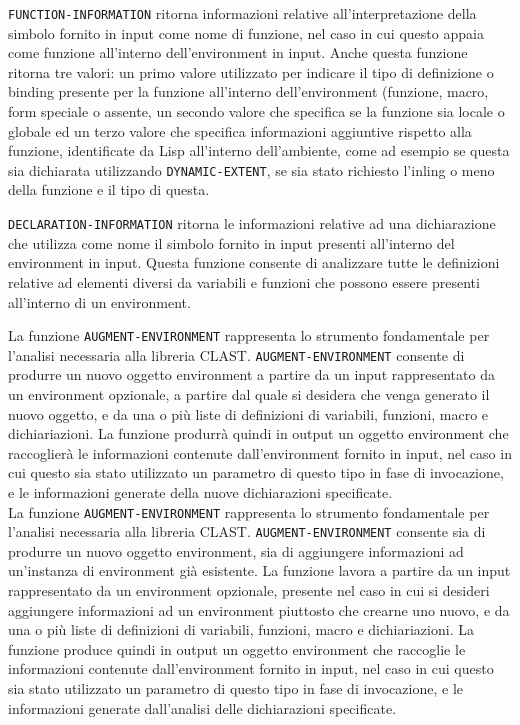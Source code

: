 \texttt{FUNCTION-INFORMATION} ritorna informazioni relative all’interpretazione
della simbolo fornito in input come nome di funzione, nel caso in cui questo
appaia come funzione all’interno dell’environment in input. Anche questa
funzione ritorna tre valori: un primo valore utilizzato per indicare il tipo di
definizione o binding presente per la funzione all’interno dell’environment
(funzione, macro, form speciale o assente, un secondo valore che specifica se
la funzione sia locale o globale ed un terzo valore che specifica informazioni
aggiuntive rispetto alla funzione, identificate da Lisp all’interno
dell’ambiente, come ad esempio se questa sia dichiarata utilizzando \texttt
{DYNAMIC-EXTENT}, se sia stato richiesto l’inling o meno della funzione e il
tipo di questa.

\texttt{DECLARATION-INFORMATION} ritorna le informazioni relative ad una
dichiarazione che utilizza come nome il simbolo fornito in input presenti
all’interno del environment in input. Questa funzione consente di analizzare
tutte le definizioni relative ad elementi diversi da variabili e funzioni che
possono essere presenti all’interno di un environment.

La funzione \texttt{AUGMENT-ENVIRONMENT} rappresenta lo strumento fondamentale
per l’analisi necessaria alla libreria CLAST. \texttt{AUGMENT-ENVIRONMENT}
consente di produrre un nuovo oggetto environment a partire da un input
rappresentato da un environment opzionale, a partire dal quale si desidera che
venga generato il nuovo oggetto, e da una o più liste di definizioni di
variabili, funzioni, macro e dichiariazioni. La funzione produrrà quindi in
output un oggetto environment che raccoglierà le informazioni contenute
dall'environment fornito in input, nel caso in cui questo sia stato utilizzato
un parametro di questo tipo in fase di invocazione, e le informazioni generate
della nuove dichiarazioni specificate.\\

La funzione \texttt{AUGMENT-ENVIRONMENT} rappresenta lo strumento fondamentale
per l’analisi necessaria alla libreria CLAST. \texttt{AUGMENT-ENVIRONMENT}
consente sia di produrre un nuovo oggetto environment, sia di aggiungere
informazioni ad un'instanza di environment già esistente. La funzione lavora a
partire da un input rappresentato da un environment opzionale, presente nel
caso in cui si desideri aggiungere informazioni ad un environment piuttosto che
crearne uno nuovo, e da una o più liste di definizioni di variabili, funzioni,
macro e dichiariazioni. La funzione produce quindi in output un oggetto
environment che raccoglie le informazioni contenute dall'environment fornito in
input, nel caso in cui questo sia stato utilizzato un parametro di questo tipo
in fase di invocazione, e le informazioni generate dall'analisi delle
dichiarazioni specificate.\\

